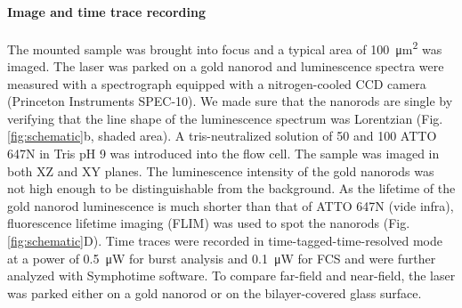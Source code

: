 \paragraph*{Image and time trace recording}
The mounted sample was brought into focus and a typical area of \SI{100}{\um\squared} was imaged.
The laser was parked on a gold nanorod and luminescence spectra were measured with a spectrograph equipped with a nitrogen-cooled CCD camera (Princeton Instruments SPEC-10).
We made sure that the nanorods are single by verifying that the line shape of the luminescence spectrum was Lorentzian (Fig. \ref{fig:schematic}b, shaded area).
A tris-neutralized solution of \SI{50}{\pM} and \SI{100}{\nM} ATTO 647N in Tris pH 9 was introduced into the flow cell.
The sample was imaged in both XZ and XY planes.
The luminescence intensity of the gold nanorods was not high enough to be distinguishable from the background.
As the lifetime of the gold nanorod luminescence is much shorter than that of ATTO 647N (vide infra), fluorescence lifetime imaging (FLIM) was used to spot the nanorods (Fig. \ref{fig:schematic}D).
Time traces were recorded in time-tagged-time-resolved mode at a power of \SI{0.5}{\uW} for burst analysis and \SI{0.1}{\uW} for FCS and were further analyzed with Symphotime software. 
To compare far-field and near-field, the laser was parked either on a gold nanorod or on the bilayer-covered glass surface.

